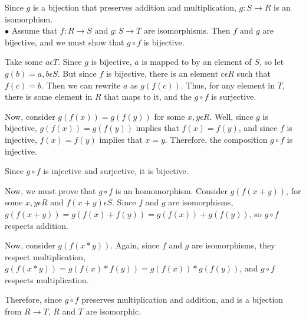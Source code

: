 \documentclass[a4paper,11pt]{article}
\begin{document}
Since $g$ is a bijection that preserves addition and multiplication, $g: S \rightarrow R$ is an isomorphism.\\

$\bullet$ Assume that $f: R \rightarrow S$ and $g: S \rightarrow T$ are isomorphisms. Then $f$ and $g$ are bijective, and we must show that $g \circ f$ is bijective.

Take some $a \epsilon T$. Since $g$ is bijective, $a$ is mapped to by an element of $S$, so let $g(b) = a, b \epsilon S$. But since $f$ is bijective, there is an element $c \epsilon R$ such that $f(c) = b$. Then we can rewrite $a$ as $g(f(c))$. Thus, for any element in $T$, there is some element in $R$ that maps to it, and the $g \circ f$ is surjective.

Now, consider $g(f(x)) = g(f(y))$ for some $x,y \epsilon R$. Well, since $g$ is bijective, $g(f(x)) = g(f(y))$ implies that $f(x) = f(y)$, and since $f$ is injective, $f(x) = f(y)$ implies that $x = y$. Therefore, the composition $g \circ f$ is injective.

Since $g \circ f$ is injective and surjective, it is bijective.

Now, we must prove that $g\circ f$ is an homomorphism. Consider $g(f(x+y))$, for some $x,y\epsilon R$ and $f(x+y)\epsilon S$. Since $f$ and $g$ are isomorphisms, $g(f(x+y)) = g(f(x)+f(y)) = g(f(x)) + g(f(y))$, so $g\circ f$ respects addition. 

Now, consider $g(f(x*y))$. Again, since $f$ and $g$ are isomorphisms, they respect multiplication, $g(f(x*y)) = g(f(x)*f(y)) = g(f(x)) * g(f(y))$, and $g\circ f$ respects multiplication.

Therefore, since $g \circ f$ preserves multiplication and addition, and is a bijection from $R \rightarrow T$, $R$ and $T$ are isomorphic.
\end{document}
